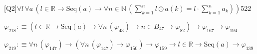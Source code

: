 \begin{fullproof}{[Q2]}{$\forall l\,\forall a\,(l \in \mathbb{R} \to \mathrm{Seq}(a) \to \forall n \in \mathbb{N}\,({\textstyle\sum_{k=1}^{n} l \odot a(k)} = l \cdot {\textstyle\sum_{k=1}^{n} a_{k}}))$}{522}
\begin{abbrevlist}
\item $\varphi_{218} :\equiv (l \in \mathbb{R} \to \mathrm{Seq}(a) \to \forall n\,(\varphi_{43}) \to n \in B_{47} \to \varphi_{82}) \to \varphi_{167} \to \varphi_{194}$
\item $\varphi_{219} :\equiv \forall n\,(\varphi_{147}) \to (\forall n\,(\varphi_{147}) \to \varphi_{150}) \to \varphi_{159} \to l \in \mathbb{R} \to \mathrm{Seq}(a) \to \varphi_{139}$
\end{abbrevlist}
\end{fullproof}
